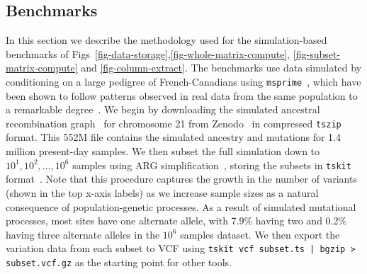 \documentclass[a4paper,num-refs]{oup-contemporary}
\begin{document}
\subsection{Benchmarks}
In this section we describe the methodology used for the simulation-based
benchmarks of Figs~\ref{fig-data-storage},\ref{fig-whole-matrix-compute},
\ref{fig-subset-matrix-compute} and \ref{fig-column-extract}.
The benchmarks use data simulated by conditioning on a large
pedigree of French-Canadians using
\texttt{msprime}~\citep{baumdicker2021efficient},
which have been shown to follow patterns observed in real
data from the same population to a remarkable
degree~\cite{anderson2023on}.
We begin by downloading the simulated ancestral recombination
graph~\cite{brandt2024promise,lewanski2024era,wong2024general}
for chromosome 21 from Zenodo~\cite{anderson2023simulated}
in compressed \texttt{tszip} format. This 552M file
contains the simulated ancestry and mutations for 1.4 million
present-day samples. We then subset the full simulation
down to ${10^1, 10^2, \dots, 10^6}$ samples using
ARG simplification~\cite{kelleher2018efficient,wong2024general},
storing the subsets in \texttt{tskit} format~\cite{tskit2024}.
Note that this procedure captures the growth
in the number of variants (shown in the top x-axis labels)
as we increase sample sizes as a
natural consequence of population-genetic processes.
As a result of simulated mutational processes,
most sites have one alternate allele,
with 7.9\% having two and 0.2\% having three
alternate alleles in the $10^6$ samples dataset.
We then export the variation data from each subset to VCF
using \texttt{tskit vcf subset.ts | bgzip > subset.vcf.gz}
as the starting point for other tools.
\end{document}
